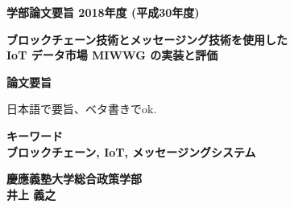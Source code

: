 \begin{center}
\textbf{\Large 学部論文要旨 2018年度 (平成30年度)}

\vspace{6.18mm}

\textbf{\large ブロックチェーン技術とメッセージング技術を使用した \\ IoT データ市場 MIWWG の実装と評価} 

\end{center}

\vspace{10mm}

\begin{flushleft}
\textbf{論文要旨}\\
\end{flushleft}
日本語で要旨、ベタ書きでok.


\begin{flushleft}
\textbf{キーワード}\\
\textbf{ブロックチェーン, IoT, メッセージングシステム}

\end{flushleft}

\begin{flushright}
\textbf{慶應義塾大学総合政策学部}\\
\textbf{井上 義之}
\end{flushright}
\newpage

